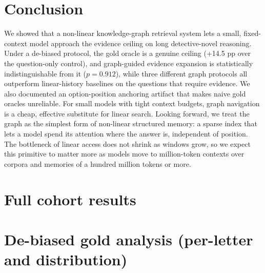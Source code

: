 \documentclass{article}
\newcommand{\pp}{\ensuremath{\,\mathrm{pp}}}
\begin{document}
\section{Conclusion}
\label{sec:conclusion}

We showed that a non-linear knowledge-graph retrieval system lets a small,
fixed-context model approach the evidence ceiling on long detective-novel
reasoning. Under a de-biased protocol, the gold oracle is a genuine ceiling
(+14.5\,\pp{} over the question-only control), and graph-guided evidence
expansion is statistically indistinguishable from it ($p=0.912$), while three
different graph protocols all outperform linear-history baselines on the
questions that require evidence. We also documented an option-position
anchoring artifact that makes naive gold oracles unreliable. For small models
with tight context budgets, graph navigation is a cheap, effective substitute
for linear search. Looking forward, we treat the graph as the simplest form of
non-linear structured memory: a sparse index that lets a model spend its
attention where the answer is, independent of position. The bottleneck of
linear access does not shrink as windows grow, so we expect this primitive to
matter more as models move to million-token contexts over corpora and memories
of a hundred million tokens or more.




\appendix
\section{Full cohort results}
\label{app:full}


\section{De-biased gold analysis (per-letter and distribution)}
\label{sec:danchor-app}
\begin{table}[t]
\centering
\caption{
Per-gold-letter accuracy (left) and selected-letter distribution (right) for the
de-biased and control runs, with the content-implied gold-letter distribution
for reference. The options-first oracle's D spike is an anchoring artifact.
}
\label{tab:danchor}

\end{table}
\end{document}
